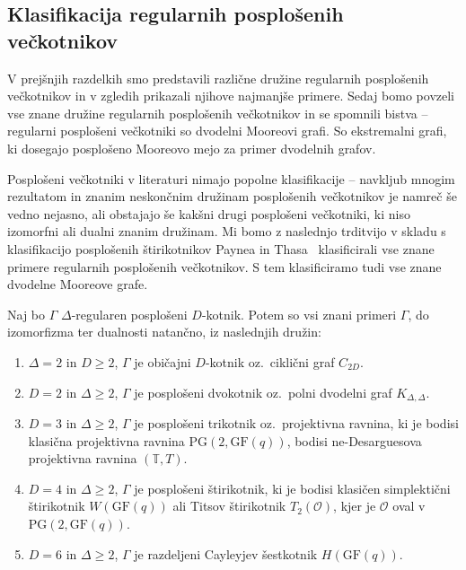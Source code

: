 \documentclass[fin1, tisk]{fmfdelo}
\newcommand{\R}{\mathbb{T}}
\newcommand{\OO}{\mathcal{O}}
\newcommand{\PG}{\mathrm{PG}}
\newcommand{\GF}{\mathrm{GF}}
\begin{document}
\subsection{Klasifikacija regularnih posplošenih večkotnikov}
V prejšnjih razdelkih smo predstavili različne družine regularnih posplošenih večkotnikov in v zgledih prikazali njihove
najmanjše primere. Sedaj bomo povzeli vse znane družine regularnih posplošenih večkotnikov in se spomnili bistva --
regularni posplošeni večkotniki so dvodelni Mooreovi grafi. So ekstremalni grafi, ki dosegajo posplošeno Mooreovo mejo
za primer dvodelnih grafov.

Posplošeni večkotniki v literaturi nimajo popolne klasifikacije -- navkljub mnogim rezultatom in znanim neskončnim družinam posplošenih večkotnikov
je namreč še vedno nejasno, ali obstajajo še kakšni drugi posplošeni večkotniki, ki niso izomorfni ali dualni znanim družinam.
Mi bomo z naslednjo trditvijo v skladu s klasifikacijo posplošenih štirikotnikov Paynea in Thasa~\cite{payne2009finite}
klasificirali vse znane primere regularnih posplošenih večkotnikov. S tem klasificiramo tudi vse znane dvodelne Mooreove grafe.

\begin{trditev}%
    Naj bo $\Gamma$ $\Delta$-regularen posplošeni $D$-kotnik. Potem so vsi znani primeri $\Gamma$, do izomorfizma ter dualnosti natančno, 
    iz naslednjih družin:
    \begin{enumerate}[label=(\roman*)]
        \item $\Delta = 2$ in $D \geq 2$, $\Gamma$ je običajni $D$-kotnik oz.~ciklični graf $C_{2D}$.
        \item $D = 2$ in $\Delta\geq 2$, $\Gamma$ je posplošeni dvokotnik oz.~polni dvodelni graf $K_{\Delta, \Delta}$.
        \item $D = 3$ in $\Delta\geq 2$, $\Gamma$ je posplošeni trikotnik oz.~projektivna ravnina, ki je bodisi klasična projektivna ravnina $\PG(2, \GF(q))$, bodisi ne-Desarguesova projektivna ravnina $(\R, T)$.
        \item $D = 4$ in $\Delta\geq 2$, $\Gamma$ je posplošeni štirikotnik, ki je bodisi klasičen simplektični štirikotnik $W(\GF(q))$ ali 
        Titsov štirikotnik $T_2(\OO)$, kjer je $\OO$ oval v $\PG(2, \GF(q))$.
        \item $D = 6$ in $\Delta\geq 2$, $\Gamma$ je razdeljeni Cayleyjev šestkotnik $H(\GF(q))$.
    \end{enumerate}
\end{trditev}
\end{document}
